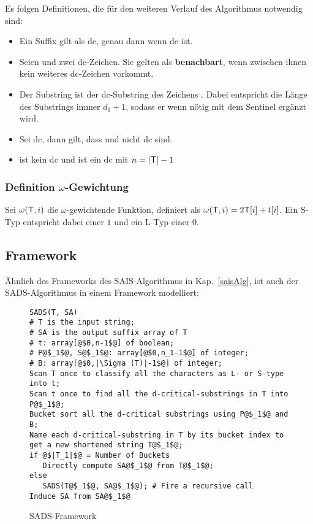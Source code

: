 \bigskip
\noindent Es folgen Definitionen, die für den weiteren Verlauf des Algorithmus notwendig sind:
\begin{itemize}
    \item   Ein Suffix  gilt als dc, genau dann wenn  dc ist.
    \item   Seien  und  zwei dc-Zeichen. Sie gelten als \textbf{benachbart}, wenn zwischen ihnen kein weiteres dc-Zeichen vorkommt.
    \item   Der Substring  ist der dc-Substring des Zeichens . Dabei entspricht die Länge des Substrings immer $d_1+1$, sodass er wenn nötig mit dem Sentinel ergänzt wird.
    \item   Sei  dc, dann gilt, dass  und  nicht dc sind.
    \item   {} ist kein dc und  ist ein dc mit $n=|\inputtext|-1$
\end{itemize}
\subsubsection{Definition $\omega$-Gewichtung}
\label{weighting}
Sei $\omega(\inputtext,i)$ die $\omega$-gewichtende Funktion, definiert als $\omega(\inputtext,i) = 2\inputtext[i]+t[i]$. Ein S-Typ entspricht dabei einer $1$ und ein L-Typ einer $0$.

\subsection{Framework}
Ähnlich des Frameworks des SAIS-Algorithmus in Kap.~\ref{saisAlg}, ist auch der SADS-Algorithmus in einem Framework\cite[Fig.~3]{saca:6} modelliert:
\label{sadsAlg}
\begin{figure}[h]
\begin{verbatim}
SADS(T, SA)
# T is the input string;
# SA is the output suffix array of T
# t: array[@$0,n-1$@] of boolean;
# P@$_1$@, S@$_1$@: array[@$0,n_1-1$@] of integer;
# B: array[@$0,|\Sigma (T)|-1$@] of integer;
Scan T once to classify all the characters as L- or S-type into t;
Scan t once to find all the d-critical-substrings in T into P@$_1$@;
Bucket sort all the d-critical substrings using P@$_1$@ and B;
Name each d-critical-substring in T by its bucket index to get a new shortened string T@$_1$@;
if @$|T_1|$@ = Number of Buckets
   Directly compute SA@$_1$@ from T@$_1$@;
else
   SADS(T@$_1$@, SA@$_1$@); # Fire a recursive call
Induce SA from SA@$_1$@
\end{verbatim}
\caption{SADS-Framework}
\end{figure}


